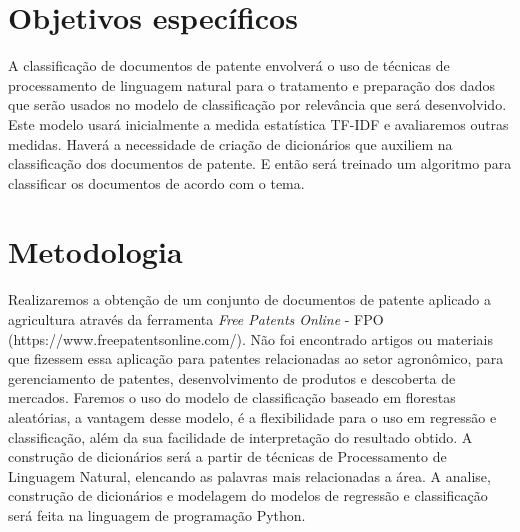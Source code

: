 \section{Objetivos específicos}
A classificação de documentos de patente envolverá o uso de técnicas de processamento de linguagem natural para o tratamento e preparação dos dados que serão usados no modelo de classificação por relevância que será desenvolvido. Este modelo usará inicialmente a medida estatística TF-IDF e avaliaremos outras medidas. Haverá a necessidade de criação de dicionários que auxiliem na classificação dos documentos de patente. E então será treinado um algoritmo para classificar os documentos de acordo com o tema. 

\section{Metodologia}
Realizaremos a obtenção de um conjunto de documentos de patente aplicado a agricultura através da ferramenta \textit{Free Patents Online} - FPO (https://www.freepatentsonline.com/). Não foi encontrado artigos ou materiais que fizessem essa aplicação para patentes relacionadas ao setor agronômico, para gerenciamento de patentes, desenvolvimento de produtos e descoberta de mercados. 
Faremos o uso do modelo de classificação baseado em florestas aleatórias, a vantagem desse modelo, é a flexibilidade para o uso em regressão e classificação, além da sua facilidade de interpretação do resultado obtido.  
A construção de dicionários será a partir de técnicas de Processamento de Linguagem Natural, elencando as palavras mais relacionadas a área. A analise, construção de dicionários e modelagem do modelos de regressão e classificação será feita na linguagem de programação Python.
